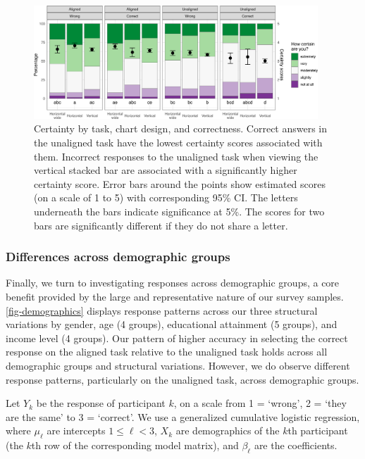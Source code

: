 \documentclass[
]{jds}
\begin{document}
\begin{figure}[hbt]

{\centering \includegraphics[width=0.95\textwidth,height=\textheight]{./figures/fig-certainty-1.png}

}

\caption{\label{fig-certainty}Certainty by task, chart design, and
correctness. Correct answers in the unaligned task have the lowest
certainty scores associated with them. Incorrect responses to the
unaligned task when viewing the vertical stacked bar are associated with
a significantly higher certainty score. Error bars around the points
show estimated scores (on a scale of 1 to 5) with corresponding 95\% CI.
The letters underneath the bars indicate significance at 5\%. The scores
for two bars are significantly different if they do not share a letter.}

\end{figure}

\hypertarget{differences-across-demographic-groups}{%
\subsubsection{Differences across demographic
groups}\label{differences-across-demographic-groups}}

Finally, we turn to investigating responses across demographic groups, a
core benefit provided by the large and representative nature of our
survey samples. \autoref{fig-demographics} displays response patterns
across our three structural variations by gender, age (4 groups),
educational attainment (5 groups), and income level (4 groups). Our
pattern of higher accuracy in selecting the correct response on the
aligned task relative to the unaligned task holds across all demographic
groups and structural variations. However, we do observe different
response patterns, particularly on the unaligned task, across
demographic groups.

Let \(Y_k\) be the response of participant \(k\), on a scale from 1 =
`wrong', 2 = `they are the same' to 3 = `correct'. We use a generalized
cumulative logistic regression, where \(\mu_\ell\) are intercepts
\(1 \le \ell < 3\), \(X_k\) are demographics of the \(k\)th participant
(the \(k\)th row of the corresponding model matrix), and
\(\beta_{\ell}\) are the coefficients.
\end{document}
